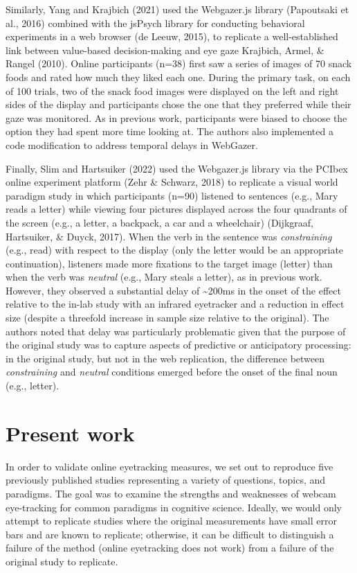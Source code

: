 \documentclass[
  man,floatsintext]{apa6}
\begin{document}
Similarly, Yang and Krajbich (2021) used the Webgazer.js library (Papoutsaki et al., 2016) combined with the jsPsych library for conducting behavioral experiments in a web browser (de Leeuw, 2015), to replicate a well-established link between value-based decision-making and eye gaze Krajbich, Armel, \& Rangel (2010). Online participants (n=38) first saw a series of images of 70 snack foods and rated how much they liked each one. During the primary task, on each of 100 trials, two of the snack food images were displayed on the left and right sides of the display and participants chose the one that they preferred while their gaze was monitored. As in previous work, participants were biased to choose the option they had spent more time looking at. The authors also implemented a code modification to address temporal delays in WebGazer.

Finally, Slim and Hartsuiker (2022) used the Webgazer.js library via the PCIbex online experiment platform (Zehr \& Schwarz, 2018) to replicate a visual world paradigm study in which participants (n=90) listened to sentences (e.g., Mary reads a letter) while viewing four pictures displayed across the four quadrants of the screen (e.g., a letter, a backpack, a car and a wheelchair) (Dijkgraaf, Hartsuiker, \& Duyck, 2017). When the verb in the sentence was \emph{constraining} (e.g., read) with respect to the display (only the letter would be an appropriate continuation), listeners made more fixations to the target image (letter) than when the verb was \emph{neutral} (e.g., Mary steals a letter), as in previous work. However, they observed a substantial delay of \textasciitilde200ms in the onset of the effect relative to the in-lab study with an infrared eyetracker and a reduction in effect size (despite a threefold increase in sample size relative to the original). The authors noted that delay was particularly problematic given that the purpose of the original study was to capture aspects of predictive or anticipatory processing: in the original study, but not in the web replication, the difference between \emph{constraining} and \emph{neutral} conditions emerged before the onset of the final noun (e.g., letter).

\hypertarget{present-work}{%
\section{Present work}\label{present-work}}

In order to validate online eyetracking measures, we set out to reproduce five previously published studies representing a variety of questions, topics, and paradigms. The goal was to examine the strengths and weaknesses of webcam eye-tracking for common paradigms in cognitive science. Ideally, we would only attempt to replicate studies where the original measurements have small error bars and are known to replicate; otherwise, it can be difficult to distinguish a failure of the method (online eyetracking does not work) from a failure of the original study to replicate.
\end{document}
